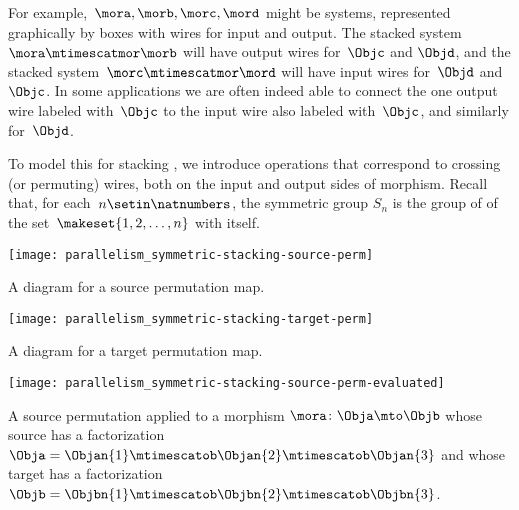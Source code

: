 For example,~$\mora, \morb, \morc, \mord$ might be systems, represented graphically by boxes with wires for input and output.
The stacked system~$\mora \mtimescatmor \morb$ will have output wires for~$\Objc$ and $\Objd$, and the stacked system~$\morc \mtimescatmor \mord$ will have input wires for~$\Objd$ and~$\Objc$.
In some applications we are often indeed able to connect the one output wire labeled with~$\Objc$ to the input wire also labeled with~$\Objc$, and similarly for~$\Objd$.

To model this for stacking , we introduce operations that correspond to crossing (or permuting) wires, both on the input and output sides of morphism.
Recall that, for each~$n \setin \natnumbers$, the symmetric group $S_n$ is the group of  of the set~$\makeset{1, 2, \ldots, n }$ with itself.


\begin{marginfigure}
    \centering
    \texttt{[image: parallelism\_symmetric-stacking-source-perm]}
    \caption{A diagram for a source permutation map.}
    \label{fig:symmetric-stacking-left-perm}
\end{marginfigure}

\begin{marginfigure}
    \centering
    \texttt{[image: parallelism\_symmetric-stacking-target-perm]}
    \caption{A diagram for a target permutation map.}
\end{marginfigure}

\begin{marginfigure}
    \centering
    \texttt{[image: parallelism\_symmetric-stacking-source-perm-evaluated]}
    \caption{A source permutation applied to a morphism $\mora \colon \Obja \mto \Objb$ whose source has a factorization $\Obja = \Objan{1} \mtimescatob \Objan{2}  \mtimescatob \Objan{3}$ and whose target has a factorization $\Objb = \Objbn{1} \mtimescatob \Objbn{2}  \mtimescatob \Objbn{3}$.}
    \label{fig:symmetric-stacking-left-perm-evaluated}
\end{marginfigure}

